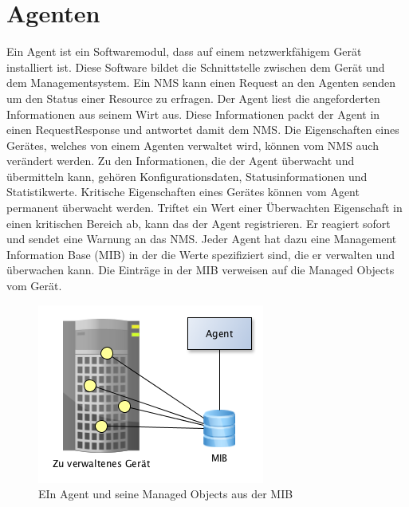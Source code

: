 \documentclass[11pt,a4paper]{article}
\begin{document}
\section*{Agenten}
Ein Agent ist ein Softwaremodul, dass auf einem netzwerkfähigem Gerät installiert ist. Diese Software bildet die Schnittstelle zwischen dem Gerät und dem Managementsystem. Ein NMS kann einen Request an den Agenten senden um den Status einer Resource zu erfragen. Der Agent liest die angeforderten Informationen aus seinem Wirt aus. Diese Informationen packt der Agent in einen RequestResponse und antwortet damit dem NMS. Die Eigenschaften eines Gerätes, welches von einem Agenten verwaltet wird, können vom NMS auch verändert werden. Zu den Informationen, die der Agent überwacht und übermitteln kann, gehören Konfigurationsdaten, Statusinformationen und Statistikwerte.
Kritische Eigenschaften eines Gerätes können vom Agent permanent überwacht werden. Triftet ein Wert einer Überwachten Eigenschaft in einen kritischen Bereich ab, kann das der Agent registrieren. Er reagiert sofort und sendet eine Warnung an das NMS.
Jeder Agent hat dazu eine Management Information Base (MIB) in der die Werte spezifiziert sind, die er verwalten und überwachen kann. Die Einträge in der MIB verweisen auf die Managed Objects vom Gerät.
\linebreak
\begin{figure}[h]
	\centering
	\includegraphics[scale=.7]{Bilder/Agent.png}
	\caption{EIn Agent und seine Managed Objects aus der MIB}
\end{figure}
\linebreak

\end{document}
